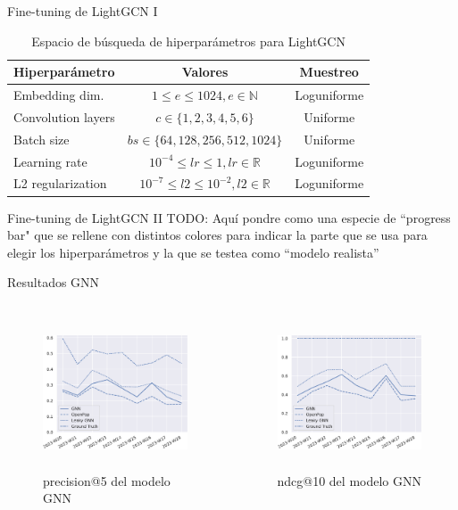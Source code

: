 \begin{frame}{Fine-tuning de LightGCN I}
\begin{table}[]
    \centering
    \begin{tabular}{l|c|c}
\textbf{Hiperparámetro} & \textbf{Valores} & \textbf{Muestreo} \\
\hline
Embedding dim. & $1\leq e\leq 1024, e\in \mathbb{N}$ & Loguniforme \\
Convolution layers & $c\in \{1,2,3,4,5,6\}$ & Uniforme \\
Batch size & $bs\in\{64,128,256,512,1024\}$ & Uniforme \\
Learning rate & $10^{-4}\leq lr\leq 1, lr\in \mathbb{R}$ & Loguniforme \\
L2 regularization & $10^{-7}\leq l2 \leq 10^{-2}, l2 \in \mathbb{R}$ & Loguniforme \\
    \end{tabular}
    \caption{Espacio de búsqueda de hiperparámetros para LightGCN}
\end{table}
\end{frame}

\begin{frame}{Fine-tuning de LightGCN II}
    TODO: Aquí pondre como una especie de ``progress bar" que se rellene con distintos colores para indicar la parte que se usa para elegir los hiperparámetros y la que se testea como ``modelo realista''
\end{frame}

\begin{frame}{Resultados GNN}
\begin{columns}
\begin{figure}
    \centering
    \includegraphics[height=45mm]{./images/graphs/09_gnn_results_precision_5_leaky.pdf}
    \caption{precision@5 del modelo GNN}
\end{figure}
\begin{figure}
    \centering
    \includegraphics[height=45mm]{./images/graphs/09_gnn_results_ndcg_10_leaky.pdf}
    \caption{ndcg@10 del modelo GNN}
\end{figure}
\end{columns}
\end{frame}

